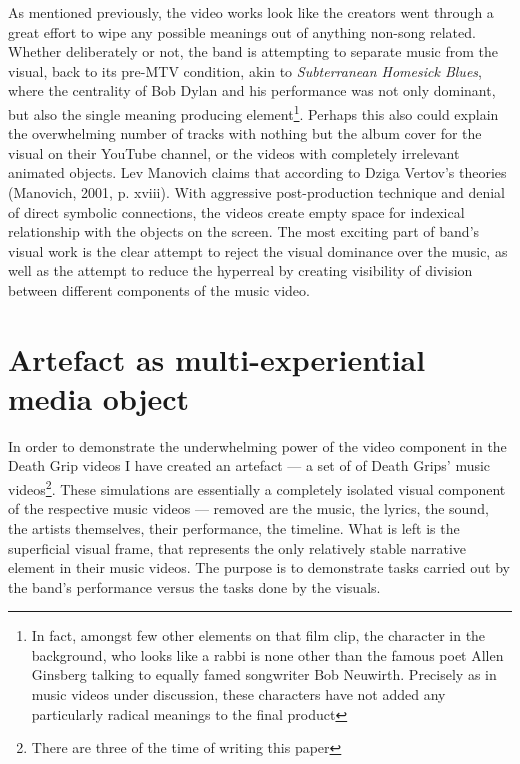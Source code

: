 \documentclass[a4paper, 11pt]{article}
\begin{document}
As mentioned previously, the video works look like the creators went through a great effort to wipe any possible meanings out of anything non-song related. Whether deliberately or not, the band is attempting to separate music from the visual, back to its pre-MTV condition, akin to \textit{Subterranean Homesick Blues}, where the centrality of Bob Dylan and his performance was not only dominant, but also the single meaning producing element\footnote{In fact, amongst few other elements on that film clip, the character in the background, who looks like a rabbi is none other than the famous poet Allen Ginsberg talking to equally famed songwriter Bob Neuwirth. Precisely as in music videos under discussion, these characters have not added any particularly radical meanings to the final product}. Perhaps this also could explain the overwhelming number of tracks with nothing but the album cover for the visual on their YouTube channel, or the videos with completely irrelevant animated objects. Lev Manovich claims that according to Dziga Vertov's theories (Manovich, 2001, p. xviii). With aggressive post-production technique and denial of direct symbolic connections, the videos create empty space for indexical relationship with the objects on the screen. The most exciting part of band’s visual work is the clear attempt to reject the visual dominance over the music, as well as the attempt to reduce the hyperreal by creating visibility of division between different components of the music video.


\section{Artefact as multi-experiential media object}

In order to demonstrate the underwhelming power of the video component in the Death Grip videos I have created an artefact — a set of  of Death Grips' music videos\footnote{There are three  of the time of writing this paper}. These simulations are essentially a completely isolated visual component of the respective music videos — removed are the music, the lyrics, the sound, the artists themselves, their performance, the timeline. What is left is the superficial visual frame, that represents the only relatively stable narrative element in their music videos. The purpose is to demonstrate tasks carried out by the band’s performance versus the tasks done by the visuals.
\end{document}
